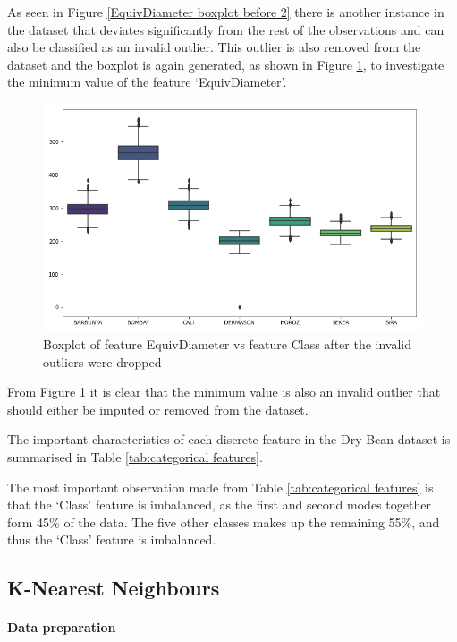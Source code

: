 \documentclass[10pt, conference]{IEEEtran}
\begin{document}
As seen in Figure \ref{EquivDiameter boxplot before 2} there is another instance in the dataset that deviates
significantly from the rest of the observations and can also be classified as an invalid outlier. This outlier
is also removed from the dataset and the boxplot is again generated, as shown in Figure
\ref{EquivDiameter boxplot before 3}, to investigate the minimum value of the feature `EquivDiameter'.
\begin{figure}[H]
    \centerline{\includegraphics[scale=0.35]{../Plots/EquivDiameter outlier boxplot 3.png}}
    \caption{Boxplot of feature EquivDiameter vs feature Class after the invalid outliers were dropped}
    \label{EquivDiameter boxplot before 3}
\end{figure}

From Figure \ref{EquivDiameter boxplot before 3} it is clear that the minimum value is also an invalid outlier
that should either be imputed or removed from the dataset.

The important characteristics of each discrete feature in the Dry Bean dataset is summarised in Table
\ref{tab:categorical features}.

The most important observation made from Table \ref{tab:categorical features} is that the `Class' feature
is imbalanced, as the first and second modes together form 45\% of the data. The five other classes
makes up the remaining 55\%, and thus the `Class' feature is imbalanced.

\subsection{K-Nearest Neighbours}

\paragraph{Data preparation}
\end{document}
